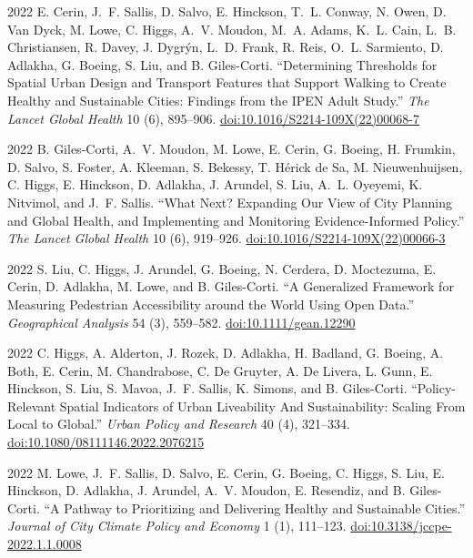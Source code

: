 \documentclass[11pt,letterpaper]{report} %
\begin{document}
\begin{tablist}
        \item[2022] \tab{}E. Cerin, J.~F. Sallis, D. Salvo, E. Hinckson, T.~L. Conway, N. Owen, D. Van Dyck, M. Lowe, C. Higgs, A.~V. Moudon, M.~A. Adams, K.~L. Cain, L.~B. Christiansen, R. Davey, J. Dygrýn, L.~D. Frank, R. Reis, O.~L. Sarmiento, D. Adlakha, G. Boeing, S. Liu, and B. Giles-Corti. \enquote{Determining Thresholds for Spatial Urban Design and Transport Features that Support Walking to Create Healthy and Sustainable Cities: Findings from the IPEN Adult Study.}  \textit{The Lancet Global Health} 10 (6), 895--906. \href{https://doi.org/10.1016/S2214-109X(22)00068-7}{doi:10.1016/S2214-109X(22)00068-7}

        \item[2022] \tab{}B. Giles-Corti, A.~V. Moudon, M. Lowe, E. Cerin, G. Boeing, H. Frumkin, D. Salvo, S. Foster, A. Kleeman, S. Bekessy, T. Hérick de Sa, M. Nieuwenhuijsen, C. Higgs, E. Hinckson, D. Adlakha, J. Arundel, S. Liu, A.~L. Oyeyemi, K. Nitvimol, and J.~F. Sallis. \enquote{What Next? Expanding Our View of City Planning and Global Health, and Implementing and Monitoring Evidence-Informed Policy.}  \textit{The Lancet Global Health} 10 (6), 919--926. \href{https://doi.org/10.1016/S2214-109X(22)00066-3}{doi:10.1016/S2214-109X(22)00066-3}

        \item[2022] \tab{}S. Liu, C. Higgs, J. Arundel, G. Boeing, N. Cerdera, D. Moctezuma, E. Cerin, D. Adlakha, M. Lowe, and B. Giles-Corti. \enquote{A Generalized Framework for Measuring Pedestrian Accessibility around the World Using Open Data.} \textit{Geographical Analysis} 54 (3), 559--582. \href{https://doi.org/10.1111/gean.12290}{doi:10.1111/gean.12290}

        \item[2022] \tab{}C. Higgs, A. Alderton, J. Rozek, D. Adlakha, H. Badland, G. Boeing, A. Both, E. Cerin, M. Chandrabose, C. De Gruyter, A. De Livera, L. Gunn, E. Hinckson, S. Liu, S. Mavoa, J.~F. Sallis, K. Simons, and B. Giles-Corti. \enquote{Policy-Relevant Spatial Indicators of Urban Liveability And Sustainability: Scaling From Local to Global.} \textit{Urban Policy and Research} 40 (4), 321--334. \href{https://doi.org/10.1080/08111146.2022.2076215}{doi:10.1080/08111146.2022.2076215}

        \item[2022] \tab{}M. Lowe, J.~F. Sallis, D. Salvo, E. Cerin, G. Boeing, C. Higgs, S. Liu, E. Hinckson, D. Adlakha, J. Arundel, A.~V. Moudon, E. Resendiz, and B. Giles-Corti. \enquote{A Pathway to Prioritizing and Delivering Healthy and Sustainable Cities.} \textit{Journal of City Climate Policy and Economy} 1 (1), 111--123. \href{https://doi.org/10.3138/jccpe-2022.1.1.0008}{doi:10.3138/jccpe-2022.1.1.0008}


\end{tablist}
\end{document}
